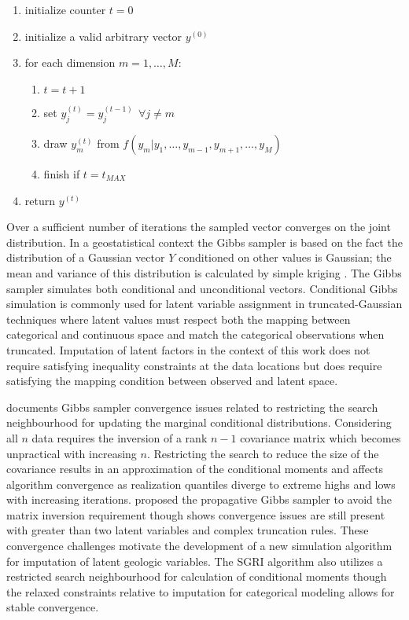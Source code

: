 \begin{enumerate}[noitemsep]
    \item initialize counter $t=0$
    \item initialize a valid arbitrary vector $y^{(0)}$
    \item for each dimension $m=1,\dots,M$:
          \begin{enumerate}
              \item $t=t+1$
              \item set $y^{(t)}_{j} = y^{(t-1)}_{j} \ \ \forall j \neq m$
              \item draw $y^{(t)}_{m}$ from  $f(y_{m}|y_{1},\dots,y_{m-1},y_{m+1},\dots,y_{M})$
              \item finish if $t=t_{MAX}$
          \end{enumerate}
    \item return $y^{(t)}$
\end{enumerate}

Over a sufficient number of iterations the sampled vector converges on the joint distribution. In a geostatistical context the Gibbs sampler is based on the fact the distribution of a Gaussian vector $Y$ conditioned on other values is Gaussian; the mean and variance of this distribution is calculated by simple kriging \citep{emery2014simulating}. The Gibbs sampler simulates both conditional and unconditional vectors. Conditional Gibbs simulation is commonly used for latent variable assignment in truncated-Gaussian techniques \citep{armstrong2011plurigaussian,silva2017multiple} where latent values must respect both the mapping between categorical and continuous space and match the categorical observations when truncated. Imputation of latent factors in the context of this work does not require satisfying inequality constraints at the data locations but does require satisfying the mapping condition between observed and latent space.

\cite{silva2018enhanced} documents Gibbs sampler convergence issues related to restricting the search neighbourhood for updating the marginal conditional distributions. Considering all $n$ data requires the inversion of a rank $n-1$ covariance matrix which becomes unpractical with increasing $n$. Restricting the search to reduce the size of the covariance results in an approximation of the conditional moments and affects algorithm convergence \citep{emery2014simulating, lauzon2020sequential} as realization quantiles diverge to extreme highs and lows with increasing iterations. \cite{lantuejoul2012simulation} proposed the propagative Gibbs sampler to avoid the matrix inversion requirement though \cite{silva2018enhanced} shows convergence issues are still present with greater than two latent variables and complex truncation rules. These convergence challenges motivate the development of a new simulation algorithm for imputation of latent geologic variables. The \gls{SGRI} algorithm also utilizes a restricted search neighbourhood for calculation of conditional moments though the relaxed constraints relative to imputation for categorical modeling allows for stable convergence.



